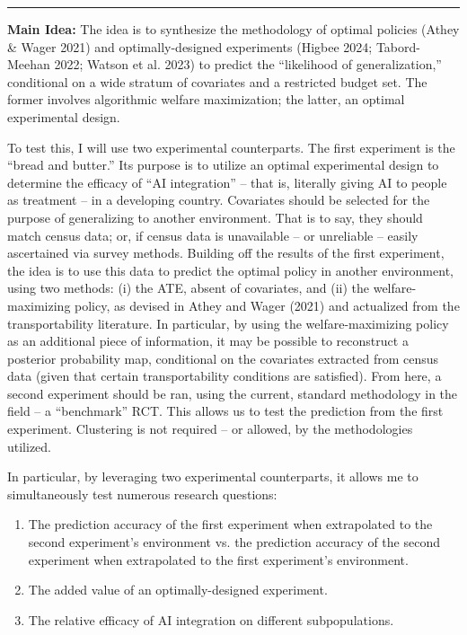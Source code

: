 \documentclass[12pt,letterpaper,doublespace, oneside]{article}
\begin{document}
\noindent\rule{\linewidth}{0.4pt}

\noindent\textbf{Main Idea:} The idea is to synthesize the methodology of optimal policies (Athey \& Wager 2021) \cite{Athey2021} and optimally-designed experiments (Higbee 2024; Tabord-Meehan 2022; Watson et al. 2023) \cite{Higbee2024} \cite{TabordMeehan2023} \cite{Watson2023} to predict the \enquote{likelihood of generalization,} conditional on a wide stratum of covariates and a restricted budget set. The former involves algorithmic welfare maximization; the latter, an optimal experimental design.

To test this, I will use two experimental counterparts. The first experiment is the \enquote{bread and butter.} Its purpose is to utilize an optimal experimental design to determine the efficacy of \enquote{AI integration} -- that is, literally giving AI to people as treatment -- in a developing country. Covariates should be selected for the purpose of generalizing to another environment. That is to say, they should match census data; or, if census data is unavailable -- or unreliable -- easily ascertained via survey methods. Building off the results of the first experiment, the idea is to use this data to predict the optimal policy in another environment, using two methods: (i) the ATE, absent of covariates, and (ii) the welfare-maximizing policy, as devised in Athey and Wager (2021) and actualized from the transportability literature. In particular, by using the welfare-maximizing policy as an additional piece of information, it may be possible to reconstruct a posterior probability map, conditional on the covariates extracted from census data (given that certain transportability conditions are satisfied). From here, a second experiment should be ran, using the current, standard methodology in the field -- a \enquote{benchmark} RCT. This allows us to test the prediction from the first experiment. Clustering is not required -- or allowed, by the methodologies utilized. 

In particular, by leveraging two experimental counterparts, it allows me to simultaneously test numerous research questions: 
\begin{enumerate}
\renewcommand{\labelenumi}{\Roman{enumi}.}
\item The prediction accuracy of the first experiment when extrapolated to the second experiment's environment vs. the prediction accuracy of the second experiment when extrapolated to the first experiment's environment. 
\item The added value of an optimally-designed experiment.
\item The relative efficacy of AI integration on different subpopulations.
\end{enumerate}
\end{document}
